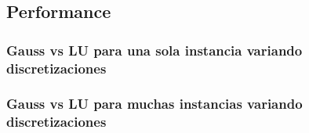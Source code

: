 \subsection{Performance}
\subsubsection{Gauss vs LU para una sola instancia variando discretizaciones}
\subsubsection{Gauss vs LU para muchas instancias variando discretizaciones}



